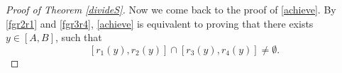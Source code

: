 \documentclass[oneside,english,a4wide]{amsart}
\numberwithin{equation}{section}
\numberwithin{figure}{section}
\theoremstyle{plain}
\theoremstyle{plain}
\theoremstyle{definition}
\theoremstyle{plain}
\theoremstyle{remark}
\theoremstyle{definition}
\theoremstyle{remark}
\theoremstyle{definition}
\newcommand{\8}{\infty}
\begin{document}
\begin{proof}[Proof of Theorem \ref{divideS}]
	
	
	\bigskip
	
	Now we come back to the proof of \eqref{achieve}. By \eqref{fgr2r1} and \eqref{fgr3r4}, \eqref{achieve} is equivalent to proving that there exists $y\in [A,B]$, such that
	\begin{equation}\label{achieve2}
		[r_1(y),r_2(y)]\cap [r_3(y),r_4(y)]\neq \emptyset. 
	\end{equation}

    \smallskip
    

\end{proof}
\end{document}
